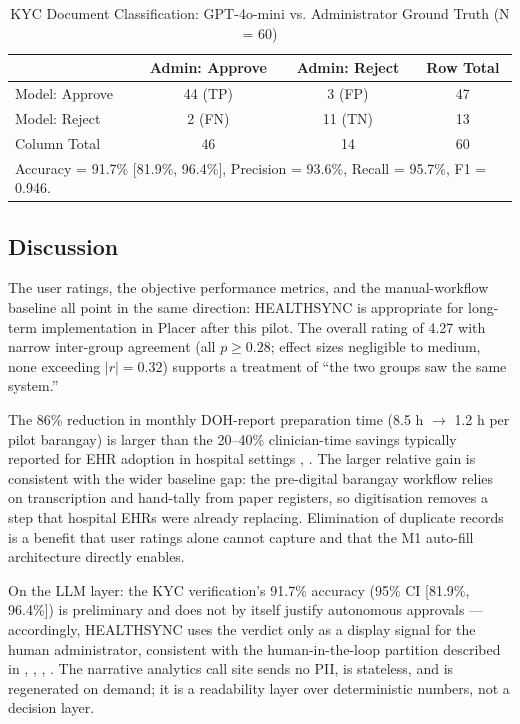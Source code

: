 \documentclass[conference]{IEEEtran}
\begin{document}
\begin{table}[!t]
\caption{KYC Document Classification: GPT-4o-mini vs. Administrator Ground Truth (N = 60)}
\label{tab:kyc}
\centering
\begin{tabular}{|l|c|c|c|}
\hline
 & \textbf{Admin: Approve} & \textbf{Admin: Reject} & \textbf{Row Total} \\
\hline
Model: Approve & 44 (TP) & 3 (FP) & 47 \\
\hline
Model: Reject & 2 (FN) & 11 (TN) & 13 \\
\hline
Column Total & 46 & 14 & 60 \\
\hline
\multicolumn{4}{l}{\footnotesize Accuracy = 91.7\% [81.9\%, 96.4\%], Precision = 93.6\%, Recall = 95.7\%, F1 = 0.946.}
\end{tabular}
\end{table}

\subsection{Discussion}
The user ratings, the objective performance metrics, and the manual-workflow baseline all point in the same direction: HEALTHSYNC is appropriate for long-term implementation in Placer after this pilot. The overall rating of 4.27 with narrow inter-group agreement (all $p \geq 0.28$; effect sizes negligible to medium, none exceeding $|r| = 0.32$) supports a treatment of ``the two groups saw the same system.''

The 86\% reduction in monthly DOH-report preparation time (8.5 h $\rightarrow$ 1.2 h per pilot barangay) is larger than the 20--40\% clinician-time savings typically reported for EHR adoption in hospital settings \cite{b10}, \cite{b11}. The larger relative gain is consistent with the wider baseline gap: the pre-digital barangay workflow relies on transcription and hand-tally from paper registers, so digitisation removes a step that hospital EHRs were already replacing. Elimination of duplicate records is a benefit that user ratings alone cannot capture and that the M1 auto-fill architecture directly enables.

On the LLM layer: the KYC verification's 91.7\% accuracy (95\% CI [81.9\%, 96.4\%]) is preliminary and does not by itself justify autonomous approvals --- accordingly, HEALTHSYNC uses the verdict only as a display signal for the human administrator, consistent with the human-in-the-loop partition described in \cite{b4}, \cite{b20}, \cite{b21}, \cite{b24}. The narrative analytics call site sends no PII, is stateless, and is regenerated on demand; it is a readability layer over deterministic numbers, not a decision layer.
\end{document}
